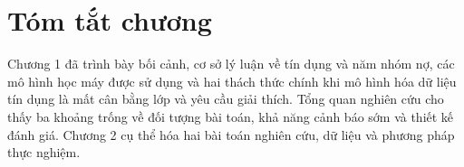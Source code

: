 \section*{Tóm tắt chương}

Chương 1 đã trình bày bối cảnh, cơ sở lý luận về tín dụng và năm nhóm nợ, các mô hình học máy được sử dụng và hai thách thức chính khi mô hình hóa dữ liệu tín dụng là mất cân bằng lớp và yêu cầu giải thích. Tổng quan nghiên cứu cho thấy ba khoảng trống về đối tượng bài toán, khả năng cảnh báo sớm và thiết kế đánh giá. Chương 2 cụ thể hóa hai bài toán nghiên cứu, dữ liệu và phương pháp thực nghiệm.
